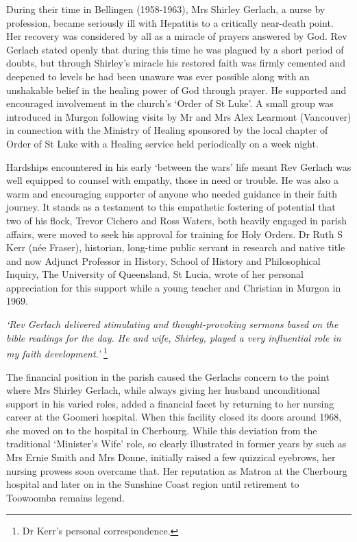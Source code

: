 During their time in Bellingen (1958-1963), Mrs Shirley Gerlach, a nurse by profession, became seriously ill with Hepatitis to a critically near-death point. Her recovery was considered by all as a miracle of prayers answered by God. Rev Gerlach stated openly that during this time he was plagued by a short period of doubts, but through Shirley's miracle his restored faith was firmly cemented and deepened to levels he had been unaware was ever possible along with an unshakable belief in the healing power of God through prayer. He supported and encouraged involvement in the church's `Order of St Luke'. A small group was introduced in Murgon following visits by Mr and Mrs Alex Learmont (Vancouver) in connection with the Ministry of Healing sponsored by the local chapter of Order of St Luke with a Healing service held periodically on a week night.



Hardships encountered in his early `between the wars' life meant Rev Gerlach was well equipped to counsel with empathy, those in need or trouble. He was also a warm and encouraging supporter of anyone who needed guidance in their faith journey. It stands as a testament to this empathetic fostering of potential that two of his flock, Trevor Cichero and Ross Waters, both heavily engaged in parish affairs, were moved to seek his approval for training for Holy Orders. Dr Ruth S Kerr (née Fraser), historian, long-time public servant in research and native title and now Adjunct Professor in History, School of History and Philosophical Inquiry, The University of Queensland, St Lucia, wrote of her personal appreciation for this support while a young teacher and Christian in Murgon in 1969.



\emph{`Rev Gerlach delivered stimulating and thought-provoking sermons based on the bible readings for the day. He and wife, Shirley, played a very influential role in my faith development.'} \footnote{Dr Kerr's personal correspondence.}


The financial position in the parish caused the Gerlachs concern to the point where Mrs Shirley Gerlach, while always giving her husband unconditional support in his varied roles, added a financial facet by returning to her nursing career at the Goomeri hospital. When this facility closed its doors around 1968, she moved on to the hospital in Cherbourg. While this deviation from the traditional `Minister's Wife' role, so clearly illustrated in former years by such as Mrs Ernie Smith and Mrs Donne, initially raised a few quizzical eyebrows, her nursing prowess soon overcame that. Her reputation as Matron at the Cherbourg hospital and later on in the Sunshine Coast region until retirement to Toowoomba remains legend.



